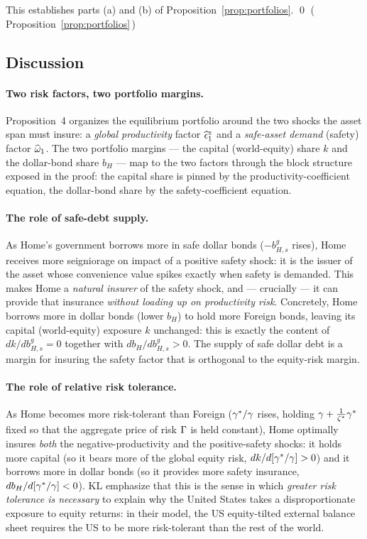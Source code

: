 \medskip
This establishes parts (a) and (b) of Proposition~\ref{prop:portfolios}. \qed
(\,Proposition~\ref{prop:portfolios}\,)

\subsection{Discussion}

\paragraph{Two risk factors, two portfolio margins.} Proposition~4 organizes the
equilibrium portfolio around the two shocks the asset span must insure: a
\emph{global productivity} factor $\widehat{\epsilon}^z_1$ and a \emph{safe-asset
demand} (safety) factor $\widehat{\omega}_1$. The two portfolio margins --- the capital
(world-equity) share $k$ and the dollar-bond share $b_H$ --- map to the two
factors through the block structure exposed in the proof: the capital share is
pinned by the productivity-coefficient equation, the dollar-bond share by the
safety-coefficient equation.

\paragraph{The role of safe-debt supply.} As Home's government borrows more in
safe dollar bonds ($-b^g_{H,s}$ rises), Home receives more seigniorage on impact
of a positive safety shock: it is the issuer of the asset whose convenience value
spikes exactly when safety is demanded. This makes Home a \emph{natural insurer}
of the safety shock, and --- crucially --- it can provide that insurance
\emph{without loading up on productivity risk}. Concretely, Home borrows more in
dollar bonds (lower $b_H$) to hold more Foreign bonds, leaving its capital
(world-equity) exposure $k$ unchanged: this is exactly the content of
$dk/db^g_{H,s}=0$ together with $db_H/db^g_{H,s}>0$. The supply of safe dollar
debt is a margin for insuring the safety factor that is orthogonal to the
equity-risk margin.

\paragraph{The role of relative risk tolerance.} As Home becomes more
risk-tolerant than Foreign ($\gamma^{*}/\gamma$ rises, holding
$\gamma+\frac{1}{\zeta^{*}}\gamma^{*}$ fixed so that the aggregate price of risk $\Gamma$ is
held constant), Home optimally insures \emph{both} the negative-productivity and
the positive-safety shocks: it holds more capital (so it bears more of the global
equity risk, $dk/d[\gamma^{*}/\gamma]>0$) and it borrows more in dollar bonds (so it
provides more safety insurance, $db_H/d[\gamma^{*}/\gamma]<0$). KL emphasize that this is
the sense in which \emph{greater risk tolerance is necessary} to explain why the
United States takes a disproportionate exposure to equity returns: in their model,
the US equity-tilted external balance sheet requires the US to be more
risk-tolerant than the rest of the world.

